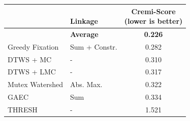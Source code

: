 \begin{figure}[t]
        \centering
\begin{minipage}[t]{0.48\textwidth}
    \centering
    \scriptsize
        \begin{tabular}[t]{l|l|c}
         & \makecell[l]{\algname{}\\ Linkage} & \makecell{Cremi-Score \\(lower is better)} \\ \midrule 
\textbf{\algname{}} & \textbf{Average}& \textbf{0.226}  \\
Greedy Fixation \cite{levinkov2017comparative} & Sum + Constr. & 0.282 \\
DTWS + MC & -& 0.310 \\
DTWS + LMC & -& 0.317 \\
Mutex Watershed \cite{wolf2018mutex} & Abs. Max.  & 0.322 \\
GAEC \cite{keuper2015efficient} & Sum & 0.334 \\
THRESH &-& 1.521 \\ 

\end{tabular}
\end{minipage}
\end{figure}
